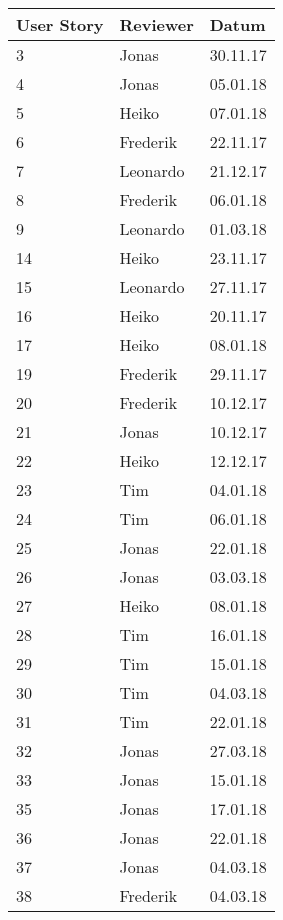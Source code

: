 \begin{table}[h]
\begin{center}
\begin{tabular}{|l|l|l|}
    \hline
    User Story & Reviewer & Datum \\\hline\hline
    3  & Jonas      & 30.11.17 \\\hline
    4  & Jonas      & 05.01.18 \\\hline
    5  & Heiko      & 07.01.18 \\\hline
    6  & Frederik   & 22.11.17 \\\hline
    7  & Leonardo   & 21.12.17 \\\hline
    8  & Frederik   & 06.01.18 \\\hline
    9  & Leonardo   & 01.03.18 \\\hline
    14 & Heiko      & 23.11.17 \\\hline
    15 & Leonardo   & 27.11.17 \\\hline
    16 & Heiko      & 20.11.17 \\\hline
    17 & Heiko      & 08.01.18\\\hline
    19 & Frederik   & 29.11.17\\\hline
    20 & Frederik   & 10.12.17\\\hline
    21 & Jonas      & 10.12.17\\\hline
    22 & Heiko      & 12.12.17\\\hline
    23 & Tim        & 04.01.18\\\hline
    24 & Tim        & 06.01.18\\\hline
    25 & Jonas      & 22.01.18 \\\hline
    26 & Jonas      & 03.03.18 \\\hline
    27 & Heiko      & 08.01.18 \\\hline
    28 & Tim        & 16.01.18 \\\hline
    29 & Tim        & 15.01.18 \\\hline
    30 & Tim        & 04.03.18 \\\hline
    31 & Tim        & 22.01.18 \\\hline
    32 & Jonas      & 27.03.18 \\\hline
    33 & Jonas      & 15.01.18 \\\hline
    35 & Jonas      & 17.01.18 \\\hline
    36 & Jonas      & 22.01.18 \\\hline
    37 & Jonas      & 04.03.18 \\\hline
    38 & Frederik   & 04.03.18 \\\hline

\end{tabular}
\end{center}
\end{table}
